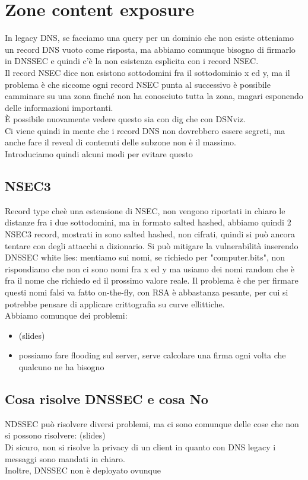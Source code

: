 \documentclass[12pt, oneside]{extbook} %
\begin{document}
\section{Zone content exposure}
In legacy DNS, se facciamo una query per un dominio che non esiste otteniamo un record DNS vuoto come risposta, ma abbiamo comunque bisogno di firmarlo in DNSSEC e quindi c'è la non esistenza esplicita con i record NSEC.\\Il record NSEC dice non esistono sottodomini fra il sottodominio x ed y, ma il problema è che siccome ogni record NSEC punta al successivo è possibile camminare su una zona finché non ha conosciuto tutta la zona, magari esponendo delle informazioni importanti.\\È possibile nuovamente vedere questo sia con dig che con DSNviz.\\Ci viene quindi in mente che i record DNS non dovrebbero essere segreti, ma anche fare il reveal di contenuti delle subzone non è il massimo.\\Introduciamo quindi alcuni modi per evitare questo
\subsection{NSEC3}
Record type cheè una estensione di NSEC, non vengono riportati in chiaro le distanze fra i due sottodomini, ma in formato salted hashed, abbiamo quindi 2 NSEC3 record, mostrati in 
sono salted hashed, non cifrati, quindi si può ancora tentare con degli attacchi a dizionario. Si può mitigare la vulnerabilità inserendo DNSSEC white lies: mentiamo sui nomi, se richiedo per "computer.bits", non rispondiamo che non ci sono nomi fra x ed y ma usiamo dei nomi random che è fra il nome che richiedo ed il prossimo valore reale. Il problema è che per firmare questi nomi falsi va fatto on-the-fly, con RSA è abbastanza pesante, per cui  si potrebbe pensare di applicare crittografia su curve ellittiche.\\Abbiamo comunque dei problemi: 
\begin{itemize}
	\item (slides)
	\item possiamo fare flooding sul server, serve calcolare una firma ogni volta che qualcuno ne ha bisogno
\end{itemize}
\subsection{Cosa risolve DNSSEC e cosa No}
NDSSEC può risolvere diversi problemi, ma ci sono comunque delle cose che non si possono risolvere: (slides)\\Di sicuro, non si risolve la privacy di un client in quanto con DNS legacy i messaggi sono mandati in chiaro.\\Inoltre, DNSSEC non è deployato ovunque
\end{document}
